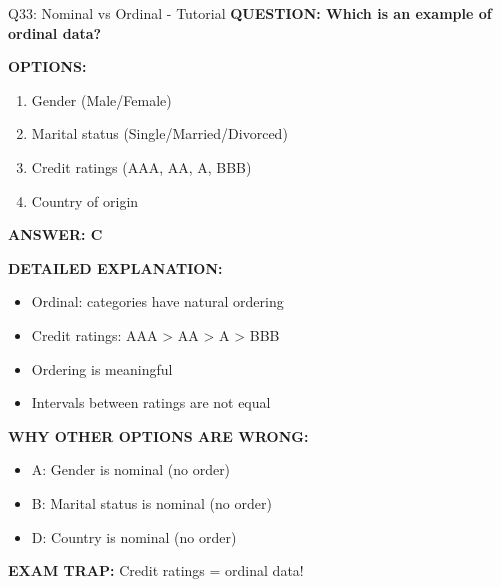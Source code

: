 \documentclass[8pt]{beamer}
\begin{document}
	\begin{frame}{Q33: Nominal vs Ordinal - Tutorial}
		\fontsize{6.5}{7.5}\selectfont
		\textbf{QUESTION: Which is an example of ordinal data?}
		
		\vspace{0.1cm}
		\textbf{OPTIONS:}
		\begin{enumerate}
			\item Gender (Male/Female)
			\item Marital status (Single/Married/Divorced)
			\item Credit ratings (AAA, AA, A, BBB)
			\item Country of origin
		\end{enumerate}
		
		\vspace{0.1cm}
		\textcolor{myblue}{\textbf{ANSWER: C}}
		
		\vspace{0.1cm}
		\textbf{DETAILED EXPLANATION:}
		\begin{itemize}
			\item Ordinal: categories have natural ordering
			\item Credit ratings: AAA > AA > A > BBB
			\item Ordering is meaningful
			\item Intervals between ratings are not equal
		\end{itemize}
		
		\vspace{0.1cm}
		\textcolor{myred}{\textbf{WHY OTHER OPTIONS ARE WRONG:}}
		\begin{itemize}
			\item \textcolor{myred}{A:} Gender is nominal (no order)
			\item \textcolor{myred}{B:} Marital status is nominal (no order)
			\item \textcolor{myred}{D:} Country is nominal (no order)
		\end{itemize}
		
		\textcolor{myred}{\textbf{EXAM TRAP:}} Credit ratings = \textcolor{myblue}{ordinal data}!
	\end{frame}
	
\end{document}
